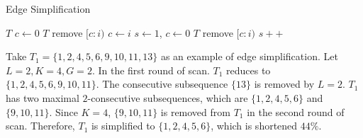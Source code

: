 

%

%


\begin{algorithm}
\caption{Edge Simplification}
\label{algo:simp_prune}
\begin{algorithmic}[1]
\Require $T$
\State $c \gets 0$
			\State $T$ remove $[c:i)$
		\EndIf
		\State $c \gets i$
	\EndIf
\EndFor
{}
\State $s\gets 1$, $c\gets 0$
			\State $T$ remove $[c:i)$
		\EndIf
	\Else
		\State $s++$
	\EndIf
\EndFor
\end{algorithmic}
\end{algorithm}

\begin{example}
Take $T_1=\{1,2,4,5,6,9,10,11,13\}$ as an example of edge simplification. Let $L = 2, K = 4, G = 2$.
In the first round of scan. $T_1$ reduces to $\{1,2,4,5,6,9,10,11\}$. The consecutive subsequence $\{13\}$
is removed by $L=2$. $T_1$ has two maximal $2$-consecutive subsequences, which 
are $\{1,2,4,5,6\}$ and $\{9,10,11\}$. Since $K=4$, $\{9,10,11\}$ is removed
from $T_1$ in the second round of scan. Therefore, $T_1$ is simplified to $\{1,2,4,5,6\}$, which is shortened $44\%$.
\end{example}


